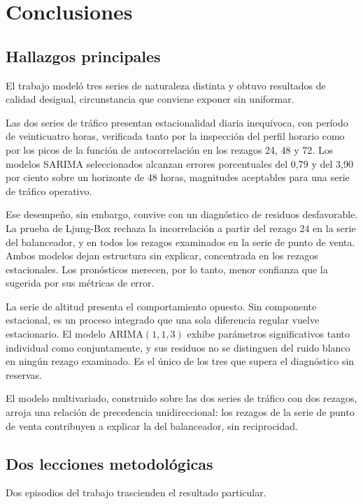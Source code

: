 \section{Conclusiones}

\subsection{Hallazgos principales}

El trabajo modeló tres series de naturaleza distinta y obtuvo resultados de calidad desigual,
circunstancia que conviene exponer sin uniformar.

Las dos series de tráfico presentan estacionalidad diaria inequívoca, con período de
veinticuatro horas, verificada tanto por la inspección del perfil horario como por los picos de
la función de autocorrelación en los rezagos 24, 48 y 72. Los modelos SARIMA seleccionados
alcanzan errores porcentuales del 0,79 y del 3,90 por ciento sobre un horizonte de 48 horas,
magnitudes aceptables para una serie de tráfico operativo.

Ese desempeño, sin embargo, convive con un diagnóstico de residuos desfavorable. La prueba de
Ljung-Box rechaza la incorrelación a partir del rezago 24 en la serie del balanceador, y en
todos los rezagos examinados en la serie de punto de venta. Ambos modelos dejan estructura sin
explicar, concentrada en los rezagos estacionales. Los pronósticos merecen, por lo tanto, menor
confianza que la sugerida por sus métricas de error.

La serie de altitud presenta el comportamiento opuesto. Sin componente estacional, es un proceso integrado que una sola diferencia regular vuelve
estacionario. El modelo
ARIMA$(1,1,3)$ exhibe parámetros significativos tanto individual como conjuntamente, y sus
residuos no se distinguen del ruido blanco en ningún rezago examinado. Es el único de los tres que supera el diagnóstico sin reservas.

El modelo multivariado, construido sobre las dos series de tráfico con dos rezagos, arroja una
relación de precedencia unidireccional: los rezagos de la serie de punto de venta contribuyen a
explicar la del balanceador, sin reciprocidad.

\subsection{Dos lecciones metodológicas}

Dos episodios del trabajo trascienden el resultado particular.

